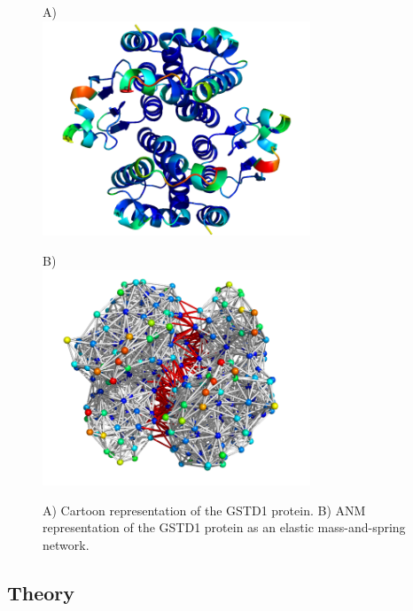 \begin{figure}[h!]
	\begin{minipage}{.48\linewidth}
		A)\\
		\includegraphics[width = 8cm]{figures/GSTD1_ANM-COM_Bfactors_structure.png}	
	\end{minipage}
	\begin{minipage}{.48\linewidth}
		B)\\
		\includegraphics[width = 8cm]{figures/GSTD1_ElasticNetwork.png}
	\end{minipage}
	\caption{A) Cartoon representation of the GSTD1 protein. B) ANM representation of the GSTD1 protein as an elastic mass-and-spring network.}	
	\label{FIG2}
\end{figure}

\subsection{Theory}

